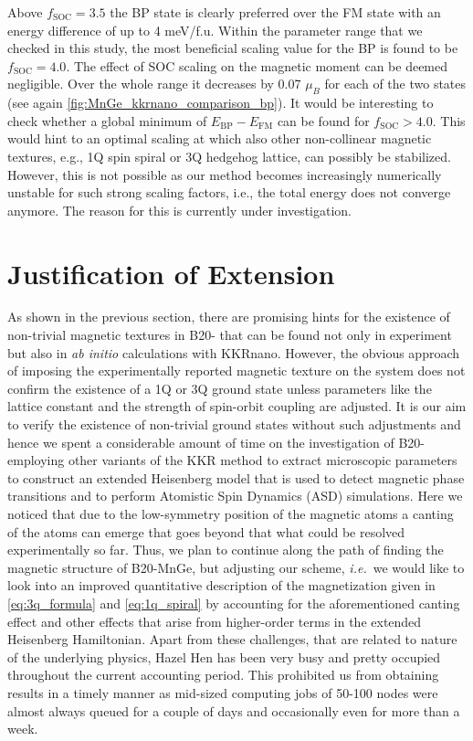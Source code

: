 \documentclass [a4paper, 12pt]{article}
\begin{document}
Above $f_{\text{SOC}}=3.5$ the BP state is clearly preferred over the FM state with
an energy difference of up to 4 meV/f.u.
Within the parameter range that we checked in this study,
the most beneficial scaling value for the BP is found to be $f_{\text{SOC}}=4.0$.
The effect of SOC scaling on the magnetic moment can be deemed negligible. Over the whole
range it decreases by 0.07 $\mu_{B}$ for each of the two states
(see again \cref{fig:MnGe_kkrnano_comparison_bp}).
It would be interesting to check whether a global minimum of $E_{\text{BP}}-E_{\text{FM}}$ can
be found for $f_{\text{SOC}} > 4.0$. This would hint to an optimal
scaling at which also other non-collinear magnetic textures, e.g., 1Q spin spiral or
3Q hedgehog lattice, can possibly be stabilized.
However, this is not possible as our method becomes increasingly numerically unstable for 
such strong scaling factors, i.e., the total energy does not converge anymore.
The reason for this is currently under investigation.

\FloatBarrier

\section{Justification of Extension}
As shown in the previous section, there are promising hints for the existence of non-trivial magnetic textures in
B20- that can be found not only in experiment but also in \textit{ab initio} calculations with KKRnano.
However, the obvious approach of imposing the experimentally reported magnetic texture on the system does not
confirm the existence of a 1Q or 3Q ground state unless parameters like the lattice constant and the strength of 
spin-orbit coupling are adjusted.
It is our aim to verify the existence of non-trivial ground states without such adjustments and hence
we spent a considerable amount of time on the investigation of B20- employing other variants
of the KKR method
to extract microscopic
parameters to construct an extended Heisenberg model that is used to detect magnetic phase transitions and
to perform Atomistic Spin Dynamics (ASD) simulations. Here we noticed that due to the low-symmetry 
position of the magnetic 
atoms a canting of the atoms can emerge that goes beyond that what could be resolved experimentally so far. 
Thus, we plan to continue along the path of finding the magnetic structure of B20-MnGe, but adjusting our scheme, 
\textit{i.e.}\  we would like to look into an improved quantitative description of the magnetization given in
\cref{eq:3q_formula} and \cref{eq:1q_spiral} by accounting for the aforementioned canting effect and
other effects that arise from higher-order terms in the extended Heisenberg Hamiltonian.
Apart from these challenges, that are related to nature of the underlying physics,
Hazel Hen has been very busy and pretty occupied throughout the current accounting period.
This prohibited us from obtaining results in a timely manner as mid-sized computing jobs of 50-100 nodes
were almost always queued for a couple of days and occasionally even for more than a week.
\end{document}
